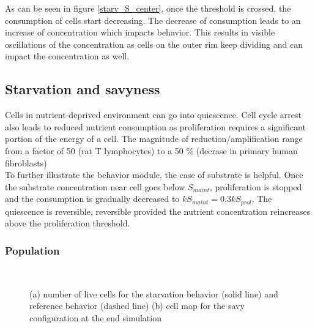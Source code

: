 \documentclass[11pt,a4paper]{article}
\begin{document}
As can be seen in figure \ref{starv_S_center}, once the threshold is crossed, the consumption of cells start decreasing. The decrease of consumption leads to an increase of concentration which impacts behavior. This results in visible oscillations of the concentration as cells on the outer rim keep dividing and can impact the concentration as well.\\


\subsection{Starvation and savyness}
Cells in nutrient-deprived environment can go into quiescence. Cell cycle arrest also leads to reduced nutrient consumption as proliferation requires a significant portion of the energy of a cell. The magnitude of reduction/amplification range from a factor of 50 (rat T lymphocytes) to a 50 \% (decrase in primary human fibroblasts)\cite{Valcourt2012}\\

To further illustrate the behavior module, the case of substrate is helpful. Once the substrate concentration near cell goes below $S_{maint}$, proliferation is stopped and the consumption is gradually decreased to $kS_{maint} = 0.3 kS_{prol}$. The quiescence is reversible, reversible provided the nutrient concentration reincreases above the proliferation threshold. \\


\subsubsection{Population}
\begin{figure}[ht!]
\begin{subfigure}{0.5\textwidth}
	\centering
	
	\caption{ \label{savy_numbers}}
\end{subfigure}
~~
\begin{subfigure}{0.5\textwidth}
	\centering
	
	\caption{\label{savy_Grid}}
\end{subfigure}
\caption{(a) number of live cells for the starvation behavior (solid line) and reference behavior (dashed line) (b) cell map for the savy configuration at the end simulation \label{savy_numbers_Grid}}
\end{figure}
\end{document}
